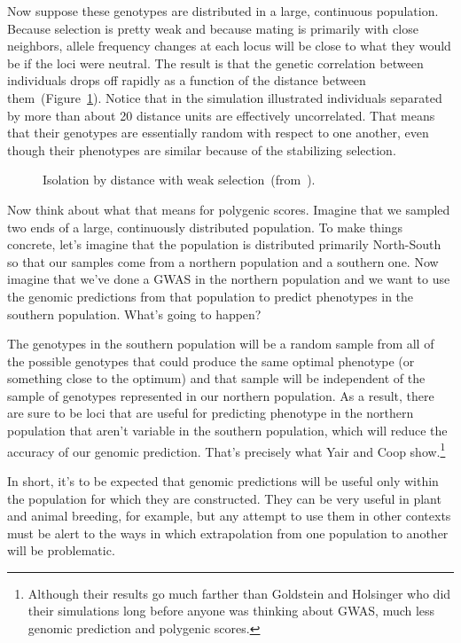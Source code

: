 \documentclass[12pt]{article}
\begin{document}
Now suppose these genotypes are distributed in a large, continuous
population. Because selection is pretty weak and because mating is
primarily with close neighbors, allele frequency changes at each locus
will be close to what they would be if the loci were neutral. The
result is that the genetic correlation between individuals drops off
rapidly as a function of the distance between
them~(Figure~\ref{fig:isolation-by-distance}). Notice that in the
simulation illustrated individuals separated by more than about 20
distance units are effectively uncorrelated. That means that their
genotypes are essentially random with respect to one another, even
though their phenotypes are similar because of the stabilizing
selection. 

\begin{figure}
\begin{center}
\end{center}
\caption{Isolation by distance with weak
  selection~(from~\cite{Goldstein-Holsinger-1992}).}\label{fig:isolation-by-distance}
\end{figure}

Now think about what that means for polygenic scores. Imagine that we
sampled two ends of a large, continuously distributed population. To
make things concrete, let's imagine that the population is distributed
primarily North-South so that our samples come from a northern
population and a southern one. Now imagine that we've done a GWAS in
the northern population and we want to use the genomic predictions
from that population to predict phenotypes in the southern
population. What's going to happen?

The genotypes in the southern population will be a random sample from
all of the possible genotypes that could produce the same optimal
phenotype (or something close to the optimum) and that sample will be
independent of the sample of genotypes represented in our northern
population. As a result, there are sure to be loci that are useful for
predicting phenotype in the northern population that aren't variable
in the southern population, which will reduce the accuracy of our
genomic prediction. That's precisely what Yair and Coop
show.\footnote{Although their results go much farther than Goldstein
  and Holsinger who did their simulations long before anyone was
  thinking about GWAS, much less genomic prediction and polygenic
  scores.}

In short, it's to be expected that genomic predictions will be useful
only within the population for which they are constructed. They can be
very useful in plant and animal breeding, for example, but any attempt
to use them in other contexts must be alert to the ways in which
extrapolation from one population to another will be problematic.




\ccLicense
\end{document}
